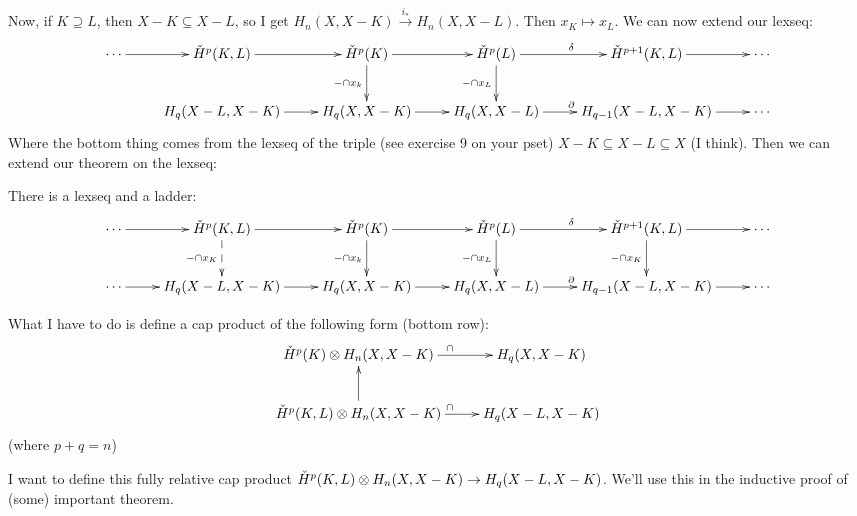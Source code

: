 Now, if $K\supseteq L$, then $X-K\subseteq X-L$, so I get $H_n(X,X-K)\xrightarrow{i_\ast} H_n(X,X-L)$. Then $x_K\mapsto x_L$. We can now extend our lexseq:
\begin{equation*}
\xymatrix{
	\cdots\ar[r] & \cHH^p(K,L)\ar[r] & \cHH^p(K)\ar[r]\ar[d]_{-\cap x_k} & \cHH^p(L)\ar[r]^\delta\ar[d]_{-\cap x_L} & \cHH^{p+1}(K,L)\ar[r] & \cdots\\
	& H_q(X-L,X-K)\ar[r]& H_q(X,X-K)\ar[r] & H_q(X,X-L)\ar[r]^\partial & H_{q-1}(X-L,X-K)\ar[r] & \cdots
}
\end{equation*}
Where the bottom thing comes from the lexseq of the triple (see exercise 9 on your pset) $X-K\subseteq X-L\subseteq X$ (I think). Then we can extend our theorem on the lexseq:
\begin{theorem}
There is a lexseq and a ladder:
\begin{equation*}
\xymatrix{
	\cdots\ar[r] & \cHH^p(K,L)\ar[r]\ar@{-->}[d]_{-\cap x_{K}} & \cHH^p(K)\ar[r]\ar[d]_{-\cap x_k} & \cHH^p(L)\ar[r]^\delta\ar[d]_{-\cap x_L} & \cHH^{p+1}(K,L)\ar[r]\ar[d]_{-\cap x_{K}} & \cdots\\
	\cdots\ar[r] & H_q(X-L,X-K)\ar[r]& H_q(X,X-K)\ar[r] & H_q(X,X-L)\ar[r]^\partial & H_{q-1}(X-L,X-K)\ar[r] & \cdots
}
\end{equation*}
\end{theorem}
What I have to do is define a cap product of the following form (bottom row):
\begin{equation*}
\xymatrix{
	\cHH^p(K)\otimes H_n(X,X-K)\ar[r]^{\cap} & H_q(X,X-K)\\
	\cHH^p(K,L)\otimes H_n(X,X-K)\ar[u]\ar[r]^{\cap} & H_q(X-L,X-K)
}
\end{equation*}
(where $p+q=n$)

I want to define this fully relative cap product $\check{H}^p(K,L)\otimes H_n(X,X-K)\to H_q(X-L,X-K)$. We'll use this in the inductive proof of (some) important theorem.

